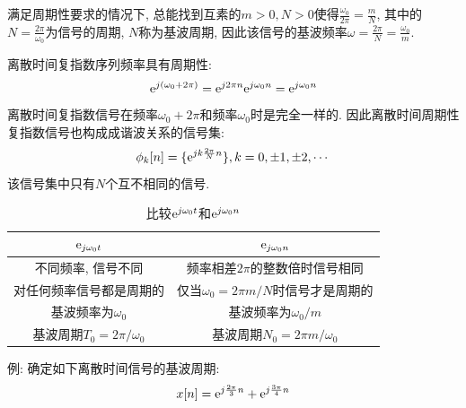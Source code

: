             满足周期性要求的情况下, 总能找到互素的$m>0, N>0$使得$\frac{\omega_0}{2\pi}=\frac{m}{N}$, 其中的$N=\frac{2\pi}{\omega_0}$为信号的周期, $N$称为基波周期, 因此该信号的基波频率$\omega=\frac{2\pi}{N}=\frac{\omega_0}{m}$.

            离散时间复指数序列频率具有周期性:
            \[\mathrm{e}^{j(\omega_0+2\pi)}=\mathrm{e}^{j2\pi n}\mathrm{e}^{j\omega_0n}=\mathrm{e}^{j\omega_0n}\]
            离散时间复指数信号在频率$\omega_0+2\pi$和频率$\omega_0$时是完全一样的. 因此离散时间周期性复指数信号也构成成谐波关系的信号集:
            \[\phi_k[n]=\{\mathrm{e}^{jk\frac{2\pi}{N}n}\}, k=0, \pm1, \pm2, \cdots\]
            该信号集中只有$N$个互不相同的信号.

            \begin{table}[h]\centering
                \caption{比较$\mathrm{e}^{j\omega_0t}$和$\mathrm{e}^{j\omega_0n}$}
                \label{tab:2:comparing-ct-dt}
                \begin{tabular}{cc}\toprule
                    \bf $\mathrm{e}_{j\omega_0t}$ & \bf $\mathrm{e}_{j\omega_0n}$ \\ \midrule
                    不同频率, 信号不同 & 频率相差$2\pi$的整数倍时信号相同 \\
                    对任何频率信号都是周期的 & 仅当$\omega_0=2\pi m/N$时信号才是周期的 \\
                    基波频率为$\omega_0$ & 基波频率为$\omega_0/m$ \\
                    基波周期$T_0=2\pi/\omega_0$ & 基波周期$N_0=2\pi m/\omega_0$ \\
                    \bottomrule
                \end{tabular}
            \end{table}

            例: 确定如下离散时间信号的基波周期:
            \[x[n]=\mathrm{e}^{j\frac{2\pi}{3}n}+\mathrm{e}^{j\frac{3\pi}{4}n}\]
